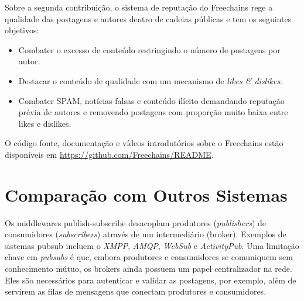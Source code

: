 \documentclass[12pt]{article}
\newcommand{\FC} {Freechains\xspace}
\begin{document}
%
Sobre a segunda contribuição, o sistema de reputação do \FC rege a qualidade
das postagens e autores dentro de cadeias públicas e tem os seguintes
objetivos:
%
\begin{itemize}
\item Combater o excesso de conteúdo restringindo o número de postagens por autor.
\item Destacar o conteúdo de qualidade com um mecanismo de \emph{likes \& dislikes}.
\item Combater SPAM, notícias falsas e conteúdo ilícito demandando reputação
      prévia de autores e removendo postagens com proporção muito baixa entre
      likes e dislikes.
\end{itemize}
%
O código fonte, documentação e vídeos introdutórios sobre o \FC estão
disponíveis em \url{https://github.com/Freechains/README}.


\section{Comparação com Outros Sistemas}
\label{sec.related}



Os middlewares publish-subscribe desacoplam produtores (\emph{publishers}) de
consumidores (\emph{subscribers}) através de um intermediário (broker).
Exemplos de sistemas pubsub incluem o \emph{XMPP}, \emph{AMQP}, \emph{WebSub} e
\emph{ActivityPub}.
Uma limitação chave em \emph{pubsubs} é que, embora produtores e consumidores
se comuniquem sem conhecimento mútuo, os brokers ainda possuem um papel
centralizador na rede.
Eles são necessários para autenticar e validar as postagens, por exemplo, além
de servirem as filas de mensagens que conectam produtores e consumidores.
\end{document}
